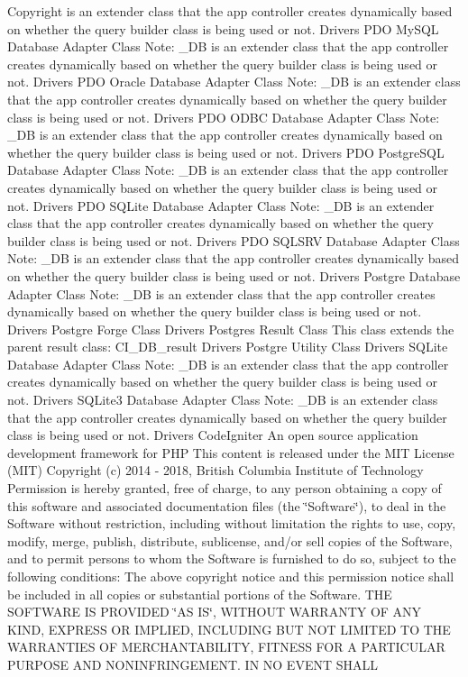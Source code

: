 \begin{DoxyCopyright}{Copyright}
is an extender class that the app controller creates dynamically based on whether the query builder class is being used or not.  Drivers P\+DO My\+S\+QL Database Adapter Class Note\+: \+\_\+\+DB is an extender class that the app controller creates dynamically based on whether the query builder class is being used or not.  Drivers P\+DO Oracle Database Adapter Class Note\+: \+\_\+\+DB is an extender class that the app controller creates dynamically based on whether the query builder class is being used or not.  Drivers P\+DO O\+D\+BC Database Adapter Class Note\+: \+\_\+\+DB is an extender class that the app controller creates dynamically based on whether the query builder class is being used or not.  Drivers P\+DO Postgre\+S\+QL Database Adapter Class Note\+: \+\_\+\+DB is an extender class that the app controller creates dynamically based on whether the query builder class is being used or not.  Drivers P\+DO S\+Q\+Lite Database Adapter Class Note\+: \+\_\+\+DB is an extender class that the app controller creates dynamically based on whether the query builder class is being used or not.  Drivers P\+DO S\+Q\+L\+S\+RV Database Adapter Class Note\+: \+\_\+\+DB is an extender class that the app controller creates dynamically based on whether the query builder class is being used or not.  Drivers Postgre Database Adapter Class Note\+: \+\_\+\+DB is an extender class that the app controller creates dynamically based on whether the query builder class is being used or not.  Drivers Postgre Forge Class  Drivers Postgres Result Class This class extends the parent result class\+: C\+I\+\_\+\+D\+B\+\_\+result  Drivers Postgre Utility Class  Drivers S\+Q\+Lite Database Adapter Class Note\+: \+\_\+\+DB is an extender class that the app controller creates dynamically based on whether the query builder class is being used or not.  Drivers S\+Q\+Lite3 Database Adapter Class Note\+: \+\_\+\+DB is an extender class that the app controller creates dynamically based on whether the query builder class is being used or not.  Drivers Code\+Igniter An open source application development framework for P\+HP This content is released under the M\+IT License (M\+IT) Copyright (c) 2014 -\/ 2018, British Columbia Institute of Technology Permission is hereby granted, free of charge, to any person obtaining a copy of this software and associated documentation files (the \char`\"{}\+Software\char`\"{}), to deal in the Software without restriction, including without limitation the rights to use, copy, modify, merge, publish, distribute, sublicense, and/or sell copies of the Software, and to permit persons to whom the Software is furnished to do so, subject to the following conditions\+: The above copyright notice and this permission notice shall be included in all copies or substantial portions of the Software. T\+HE S\+O\+F\+T\+W\+A\+RE IS P\+R\+O\+V\+I\+D\+ED \char`\"{}\+A\+S I\+S\char`\"{}, W\+I\+T\+H\+O\+UT W\+A\+R\+R\+A\+N\+TY OF A\+NY K\+I\+ND, E\+X\+P\+R\+E\+SS OR I\+M\+P\+L\+I\+ED, I\+N\+C\+L\+U\+D\+I\+NG B\+UT N\+OT L\+I\+M\+I\+T\+ED TO T\+HE W\+A\+R\+R\+A\+N\+T\+I\+ES OF M\+E\+R\+C\+H\+A\+N\+T\+A\+B\+I\+L\+I\+TY, F\+I\+T\+N\+E\+SS F\+OR A P\+A\+R\+T\+I\+C\+U\+L\+AR P\+U\+R\+P\+O\+SE A\+ND N\+O\+N\+I\+N\+F\+R\+I\+N\+G\+E\+M\+E\+NT. IN NO E\+V\+E\+NT S\+H\+A\+LL 
\end{DoxyCopyright}
